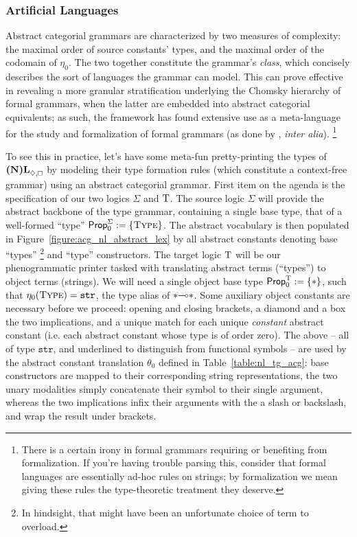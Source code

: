 \subsubsection{Artificial Languages}
Abstract categorial grammars are characterized by two measures of complexity: the maximal order of source constants' types, and the maximal order of the codomain of $\eta_0$.
The two together constitute the grammar's \textit{class}, which concisely describes the sort of languages the grammar can model.
This can prove effective in revealing a more granular stratification underlying the Chomsky hierarchy of formal grammars, when the latter are embedded into abstract categorial equivalents; as such, the framework has found extensive use as a meta-language for the study and formalization of formal grammars (as done by \citet{de2004expressive}, \textit{inter alia}).
\footnote{There is a certain irony in formal grammars requiring or benefiting from formalization. If you're having trouble parsing this, consider that formal languages are essentially ad-hoc rules on strings; by formalization we mean giving these rules the type-theoretic treatment they deserve.}

To see this in practice, let's have some meta-fun pretty-printing the types of $\logic{(N)L}_{\diamond, \bx}$ by modeling their type formation rules (which constitute a context-free grammar) using an abstract categorial grammar.
First item on the agenda is the specification of our two logics $\Sigma$ and $\mathrm{T}$.
The source logic $\Sigma$ will provide the abstract backbone of the type grammar, containing a single base type, that of a well-formed ``type'' 
$\propcon^{\Sigma} := \{ \type[s] \}$.
The abstract vocabulary is then populated in Figure~\ref{figure:acg_nl_abstract_lex} by all abstract constants denoting base ``types''%
\footnote{In hindsight, that might have been an unfortunate choice of term\textsuperscript{\thefootnote} to overload.} and ``type'' constructors.
The target logic $\mathrm{T}$ will be our phenogrammatic printer tasked with translating abstract terms (``types'') to object terms (strings).
We will need a single object base type  $\mathsf{Prop}_0^{\mathrm{T}} := \{ * \}$, such that $\eta_0(\type[s]) = \mathtt{str}$, the type alias of $*\li *$.
Some auxiliary object constants are necessary before we proceed: opening and closing brackets, a diamond and a box the two implications, and a unique match for each unique \textit{constant} abstract constant (i.e. each abstract constant whose type is of order zero).
The above -- all of type $\mathtt{str}$, and underlined to distinguish from functional symbols -- are used by the abstract constant translation $\theta_0$ defined in Table~\ref{table:nl_tg_acg}: base constructors are mapped to their corresponding string representations, the two unary modalities simply concatenate their symbol to their single argument, whereas the two implications infix their arguments with the a slash or backslash, and wrap the result under brackets.

